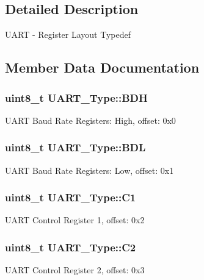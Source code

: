 \subsection{Detailed Description}
U\+A\+RT -\/ Register Layout Typedef 

\subsection{Member Data Documentation}
\subsubsection[{\texorpdfstring{B\+DH}{BDH}}]{ uint8\+\_\+t U\+A\+R\+T\+\_\+\+Type\+::\+B\+DH}\hypertarget{structUART__Type_a64b68e0c2e2c00962c1f6ff05768a247}{}\label{structUART__Type_a64b68e0c2e2c00962c1f6ff05768a247}
U\+A\+RT Baud Rate Registers\+: High, offset\+: 0x0 
\subsubsection[{\texorpdfstring{B\+DL}{BDL}}]{ uint8\+\_\+t U\+A\+R\+T\+\_\+\+Type\+::\+B\+DL}\hypertarget{structUART__Type_a82d811085ff9f014e2412f0306ca99cc}{}\label{structUART__Type_a82d811085ff9f014e2412f0306ca99cc}
U\+A\+RT Baud Rate Registers\+: Low, offset\+: 0x1 
\subsubsection[{\texorpdfstring{C1}{C1}}]{ uint8\+\_\+t U\+A\+R\+T\+\_\+\+Type\+::\+C1}\hypertarget{structUART__Type_a7d2060193a370f0e9a31ccbcc18324af}{}\label{structUART__Type_a7d2060193a370f0e9a31ccbcc18324af}
U\+A\+RT Control Register 1, offset\+: 0x2 
\subsubsection[{\texorpdfstring{C2}{C2}}]{ uint8\+\_\+t U\+A\+R\+T\+\_\+\+Type\+::\+C2}\hypertarget{structUART__Type_a4050bfe335adcde0e5b87823ea26bc28}{}\label{structUART__Type_a4050bfe335adcde0e5b87823ea26bc28}
U\+A\+RT Control Register 2, offset\+: 0x3 
